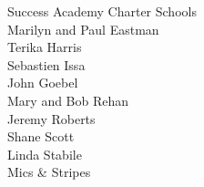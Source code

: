 \documentclass{article}[10pt]
\begin{document}
\begin{center}
\begin{minipage}{4.2in}
\begin{center}
                \begin{small}
                    \vspace{-0.11in}
                    \begin{multicols*}{2}
                    {Success Academy Charter Schools}
                        \\
                        Marilyn and Paul Eastman\\
                        Terika Harris\\
                        Sebastien Issa\\
                        John Goebel\\
                        Mary and Bob Rehan\\
                        Jeremy Roberts \\
                        Shane Scott\\
                        Linda Stabile\\
                        Mics \& Stripes
                    \end{multicols*}
                \end{small}
            \end{center}

        \end{minipage}
    \vfill

    \end{center}
\end{document}
